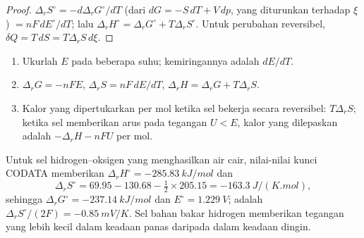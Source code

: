 \begin{proof}
$\Delta_r S^\circ = -d\Delta_r G^\circ/dT$ (dari $dG = -S\,dT + V\,dp$, yang
diturunkan terhadap $\xi$) $= nF\,dE^\circ/dT$; lalu
$\Delta_r H^\circ = \Delta_r G^\circ
+ T\Delta_r S^\circ$. Untuk perubahan
reversibel, $\delta Q = T\,dS = T\Delta_r S\,
d\xi$.
\end{proof}

\begin{method}\label{met:b2:cell-thermodynamics:cell-data}
\begin{enumerate}
  \item Ukurlah $E$ pada beberapa suhu; kemiringannya adalah $dE/dT$.
  \item $\Delta_r G = -nFE$, $\Delta_r S = nF\,dE/dT$,
        $\Delta_r H = \Delta_r G +
        T\Delta_r S$.
  \item Kalor yang dipertukarkan per mol ketika sel bekerja secara
        reversibel: $T\Delta_r S$; ketika sel memberikan arus pada tegangan
        $U < E$, kalor yang dilepaskan adalah $-\Delta_r H - nFU$ per mol.
\end{enumerate}
\end{method}

Untuk sel hidrogen--oksigen yang menghasilkan air cair, nilai-nilai kunci
CODATA memberikan $\Delta_r H^\circ = \qty{-285.83}{kJ/mol}$ dan
\[
  \Delta_r S^\circ = 69.95 - 130.68 - \tfrac12 \times 205.15 = \qty{-163.3}{J/(K.mol)} ,
\]
sehingga $\Delta_r G^\circ = \qty{-237.14}{kJ/mol}$ dan
$E^\circ = \qty{1.229}{V}$;  adalah
$\Delta_r S^\circ/(2F) = \qty{-0.85}{mV/K}$. Sel bahan bakar hidrogen
memberikan tegangan yang lebih kecil dalam keadaan panas daripada dalam
keadaan dingin.

